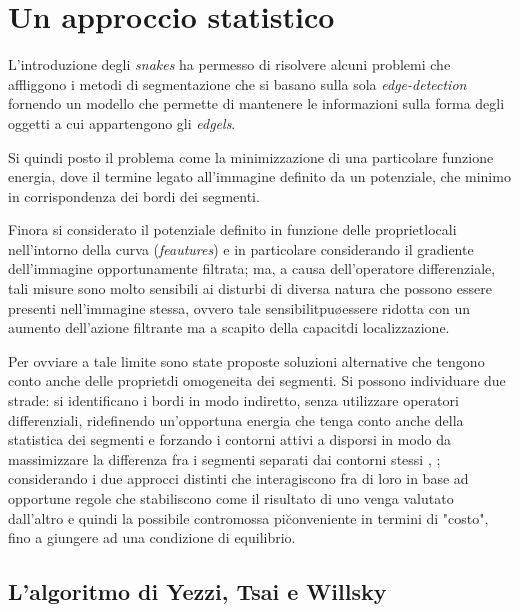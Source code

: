 
\section{Un approccio statistico}

L'introduzione degli {\it snakes} ha permesso di risolvere alcuni problemi che affliggono i metodi
di segmentazione che si basano sulla sola {\it edge-detection} fornendo un modello che permette
di mantenere le informazioni sulla forma degli oggetti a cui appartengono gli {\it edgels}.

Si \e quindi posto il problema come la minimizzazione di una particolare funzione
energia, dove il termine legato all'immagine \e definito da un potenziale, che \e minimo
in corrispondenza dei bordi dei segmenti.

Finora si \e considerato il potenziale definito in funzione delle propriet\a locali 
nell'intorno della curva ({\it feautures}) e in particolare considerando il gradiente dell'immagine
opportunamente filtrata; ma, a causa dell'operatore differenziale, 
tali misure sono molto sensibili ai disturbi di diversa natura
che possono essere presenti nell'immagine stessa, ovvero
tale sensibilit\a pu\o essere ridotta con un aumento
dell'azione filtrante ma a scapito della capacit\a di localizzazione.

Per ovviare a tale limite sono state proposte soluzioni alternative che 
tengono conto anche delle propriet\a di omogeneita dei segmenti.
Si possono individuare due strade:
\ben
\im si identificano i bordi in modo indiretto, senza utilizzare operatori differenziali,
    ridefinendo un'opportuna energia che tenga conto anche della statistica dei segmenti
    e forzando i contorni attivi a disporsi in modo da massimizzare la differenza fra
    i segmenti separati dai contorni stessi \cite{Yezzi}, \cite{Yuille};
\im considerando i due approcci distinti che interagiscono fra di loro in base ad opportune
    regole \cite{Duncan} che stabiliscono come il risultato di uno venga valutato
    dall'altro e quindi la possibile contromossa pi\u conveniente in termini di "costo",
    fino a giungere ad una condizione di equilibrio.
\een

\subsection{L'algoritmo di Yezzi, Tsai e Willsky}

